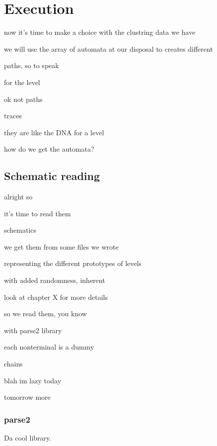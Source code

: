 \chapter{Execution}

now it's time to make a choice with the clustring data we have

we will use the array of automata at our disposal to creates different

paths, so to speak

for the level

ok not paths

traces

they are like the DNA for a level

how do we get the automata?

\section{Schematic reading}

alright so

it's time to read them

schematics

we get them from some files we wrote

representing the different prototypes of levels

with added randomness, inherent

look at chapter X for more details

so we read them, you know

with parse2 library

each nonterminal is a dummy

chains

blah im lazy today

tomorrow more

\subsection{parse2}

Da cool library.

